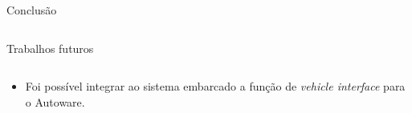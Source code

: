 \documentclass{if-beamer}
\begin{document}
\begin{frame}{Conclusão}
\begin{columns}
\begin{column}{0.435\textwidth}
\begin{block}{Trabalhos futuros}
			\end{block}
			
		\end{column}
		
	\end{columns}

\pause

	\begin{block}{}
		
		\begin{itemize}
			\item Foi possível integrar ao sistema embarcado a função de \textit{vehicle interface} para o Autoware.
			
		\end{itemize}
		
	\end{block}
	
\end{frame}
\end{document}
